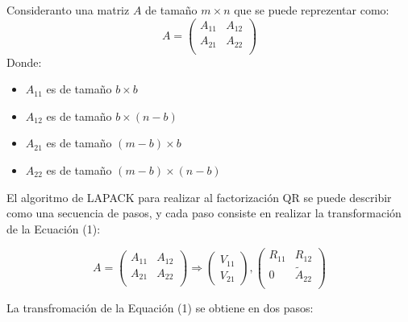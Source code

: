 \documentclass[12pt]{article}
\begin{document}
Consideranto una matriz $A$ de tamaño $m \times n$ que se puede reprezentar como:
\begin{displaymath}
  A=\left(\begin{array}{cc}
    A_{11} & A_{12}  \\
    A_{21} & A_{22}  \\
  \end{array}\right)
\end{displaymath}
Donde:
\begin{itemize}
  \item $A_{11}$ es de tamaño $b \times b$
  \item $A_{12}$ es de tamaño $b \times (n-b)$
  \item $A_{21}$ es de tamaño $(m-b) \times b$
  \item $A_{22}$ es de tamaño $(m-b) \times (n-b)$
\end{itemize}

El algoritmo de LAPACK para realizar al factorización QR se puede describir como una secuencia de pasos, y cada paso consiste en realizar la transformación de la Ecuación (1):

\begin{equation}
  \label{eq:lap_qr0}
  A=\left(\begin{array}{cc}
    A_{11} & A_{12}  \\
    A_{21} & A_{22}  \\
  \end{array}\right) \Longrightarrow
  \left(\begin{array}{c}
      V_{11} \\
      V_{21}
\end{array}\right), \left(\begin{array}{cc}

    R_{11}   & R_{12}        \\
      0     &\tilde{A}_{22} \\
  \end{array}\right)
\end{equation}

La transfromación de la Equación (1) se obtiene en dos pasos:
\end{document}
